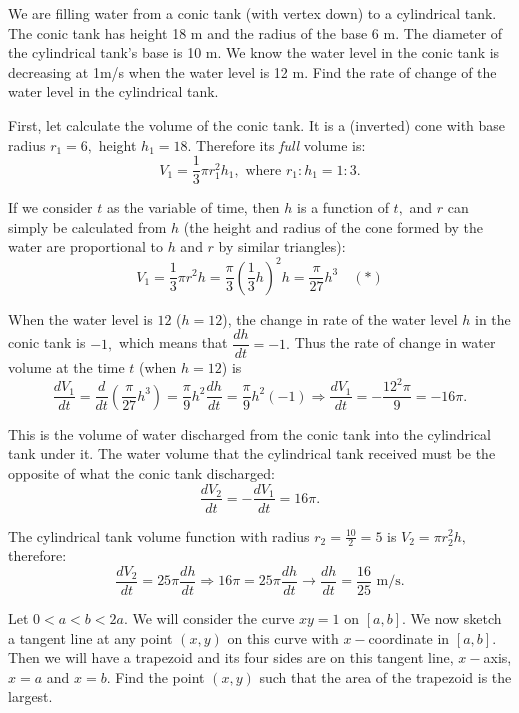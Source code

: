 \documentclass{article}
\begin{document}
\newpage

\begin{problem*}[4]
    We are filling water from a conic tank (with vertex down) to a cylindrical tank.
    The conic tank has height 18 m and the radius of the base 6 m. The diameter of the cylindrical tank’s base is 10 m.
    We know the water level in the conic tank is decreasing at 1m/s when the water level is 12 m.
    Find the rate of change of the water level in the cylindrical tank.
\end{problem*}

\begin{soln}
    First, let calculate the volume of the conic tank. It is a (inverted) cone with base radius $r_1 = 6,$ height $h_1 = 18.$
    Therefore its \textit{full} volume is:
    \[
        V_1 = \frac{1}{3} \pi r_1^2 h_1,\text{\ where\ } r_1 : h_1 = 1 : 3.
    \] 

    If we consider $t$ as the variable of time, then $h$ is a function of $t,$ and $r$ can simply be calculated from $h$
    (the height and radius of the cone formed by the water are proportional to $h$ and $r$ by similar triangles):
    \[
        V_1 = \frac{1}{3} \pi r^2 h = \frac{\pi}{3} \left(\frac{1}{3} h \right)^2 h =  \frac{\pi}{27} h^3 \quad (*)
    \]

    When the water level is $12$ ($h = 12$), the change in rate of the water level $h$ in the conic tank is $-1,$ which means that $\dfrac{dh}{dt} = -1.$
    Thus the rate of change in water volume at the time $t$ (when $h=12$) is
    \[
        \frac{dV_1}{dt} = \frac{d}{dt} \left( \frac{\pi}{27} h^3 \right) = \frac{\pi}{9} h^2 \dfrac{dh}{dt} = \frac{\pi}{9} h^2 (-1)
        \Rightarrow \frac{dV_1}{dt} = - \frac{12^2 \pi}{9} = - 16\pi.
    \]

    This is the volume of water discharged from the conic tank into the cylindrical tank under it.
    The water volume that the cylindrical tank received must be the opposite of what the conic tank discharged:
    \[
        \frac{dV_2}{dt} = - \frac{dV_1}{dt} = 16\pi.
    \]

    The cylindrical tank volume function with radius $r_2 = \frac{10}{2}  = 5$ is $V_2 = \pi r_2^2 h,$ therefore:
    \[
        \frac{dV_2}{dt} = 25 \pi \frac{dh}{dt} \Rightarrow 16\pi = 25 \pi \frac{dh}{dt}  \rightarrow \frac{dh}{dt}  = \boxed{\frac{16}{25}} \text{\ m/s.}
    \]
\end{soln}

\newpage

\begin{problem*}[5]
    Let $0 < a < b < 2a.$ We will consider the curve $xy=1$ on $[a,b].$ We now sketch a tangent line at any point $(x,y)$ on this curve with $x-$coordinate in $[a,b].$
    Then we will have a trapezoid and its four sides are on this tangent line, $x-$axis, $x = a$ and $x = b.$
    Find the point $(x, y)$ such that the area of the trapezoid is the largest.
\end{problem*}
\end{document}
